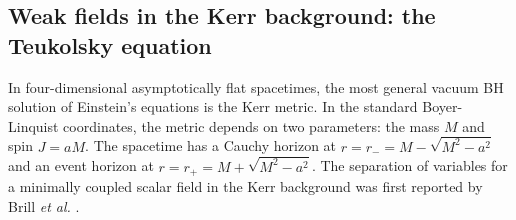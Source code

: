 \documentclass[]{iopart}
\begin{document}
\subsection{\label{sec:Kerr}Weak fields in the Kerr background: the Teukolsky equation}
In four-dimensional asymptotically flat spacetimes, the most general vacuum BH
solution of Einstein's equations is the Kerr metric. In the standard
Boyer-Linquist coordinates, the metric depends on two parameters: the mass $M$
and spin $J=aM$. The spacetime has a Cauchy horizon at
$r=r_-=M-\sqrt{M^2-a^2}$ and an event horizon at $r=r_+=M+\sqrt{M^2-a^2}$. The
separation of variables for a minimally coupled scalar field in the Kerr
background was first reported by Brill {\it et al.} \cite{Brill:1972xj}.
\end{document}
